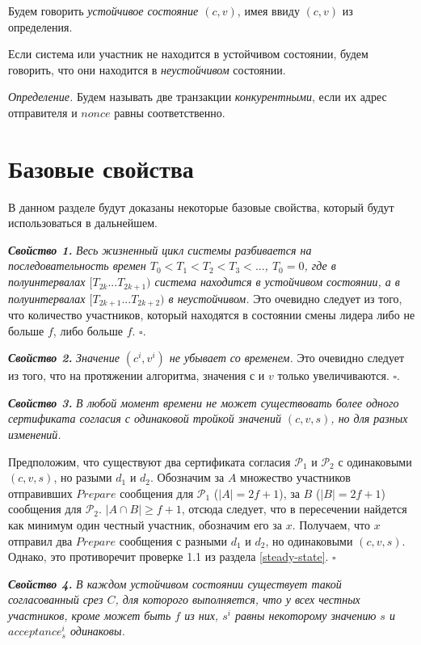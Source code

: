 Будем говорить \textit{устойчивое состояние $(c, v)$}, имея ввиду $(c, v)$ из определения.

Если система или участник не находится в устойчивом состоянии, будем говорить, что они находится в \textit{неустойчивом} состоянии.

\textit{Определение.} Будем называть две транзакции \textit{конкурентными}, если их адрес отправителя и $nonce$ равны соответственно.

\section{Базовые свойства}
В данном разделе будут доказаны некоторые базовые свойства, который будут использоваться в дальнейшем.

\textbf{\textit{Свойство 1.}} \textit{Весь жизненный цикл системы разбивается на последовательность времен
$T_0 < T_1 < T_2 < T_3 < ...$, $T_0=0$, где в полуинтервалах $[T_{2k}...T_{2k+1})$ система находится в устойчивом состоянии, а в полуинтервалах $[T_{2k+1}...T_{2k+2})$ в неустойчивом.}
Это очевидно следует из того, что количество участников, который находятся в состоянии смены лидера либо не больше $f$, либо больше $f$. $\square$.
\vspace{10pt}

\textbf{\textit{Свойство 2.}} \textit{Значение $(c^i, v^i)$ не убывает со временем.}
Это очевидно следует из того, что на протяжении алгоритма, значения $с$ и $v$ только увеличиваются. $\square$.
\vspace{10pt}

\textbf{\textit{Свойство 3.}} \textit{В любой момент времени не может существовать более одного сертификата согласия с одинаковой тройкой значений $(c, v, s)$, но для разных изменений.} 

Предположим, что существуют два сертификата согласия $\mathcal{P}_1$ и $\mathcal{P}_2$ с одинаковыми $(c, v, s)$, но разыми $d_1$ и $d_2$. 
Обозначим за $A$ множество участников отправивших $Prepare$ сообщения для  $\mathcal{P}_1$ ($|A|=2f+1$), за $B$ ($|B|=2f+1$) сообщения для $\mathcal{P}_2$. $|A \cap B| \ge f+1$, отсюда следует, что в пересечении найдется как минимум один честный участник, обозначим его за $x$. Получаем, что $x$ отправил два $Prepare$ сообщения с разными $d_1$ и $d_2$, но одинаковыми $(c, v, s)$. Однако, это противоречит проверке 1.1 из раздела \ref{steady-state}. $\square$
\vspace{10pt}

\textbf{\textit{Свойство 4.}} \textit{В каждом устойчивом состоянии существует такой согласованный срез $C$, для которого выполняется, что у всех честных участников, кроме может быть $f$ из них, $s^i$ равны некоторому значению $s$ и $acceptance^i_s$ одинаковы.}


